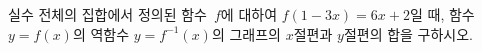 실수 전체의 집합에서 정의된 함수~$f$에 대하여 $f(1-3x)=6x+2$일 때, 함수 $y=f(x)$의 역함수 $y=f^{-1}(x)$의 그래프의 $x$절편과 $y$절편의 합을 구하시오.
